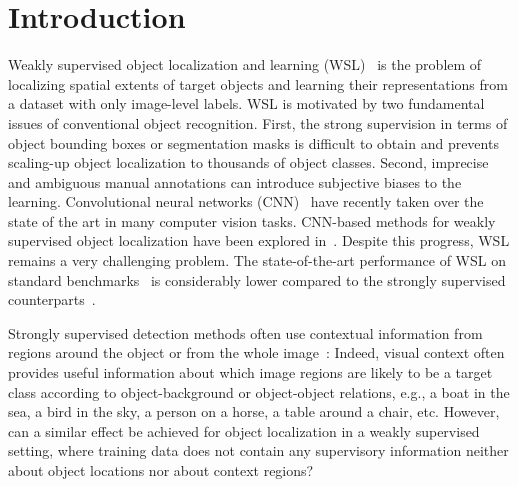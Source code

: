 \documentclass[runningheads]{llncs}
\begin{document}
\section{Introduction}

Weakly supervised object localization and learning
(WSL)~\cite{Wang:2014tg,Cinbis:2015wn} is the problem of localizing spatial
extents of target objects and learning their representations from a dataset with
only image-level labels. %
WSL is motivated by two fundamental issues of conventional object recognition.
First, the strong supervision in terms of object bounding boxes or segmentation
masks is difficult to obtain and prevents scaling-up object localization to
thousands of object classes. Second, imprecise and ambiguous manual annotations
can introduce subjective biases to the learning. 
Convolutional neural networks (CNN)~\cite{LeCun:1989bx,Krizhevsky:2012wl}
have recently taken over the state of the art in many computer vision tasks.
CNN-based methods for weakly supervised object localization have been explored
in~\cite{Oquab:2015us,Bilen:2015uo}.
Despite this progress, WSL remains a very challenging problem. The state-of-the-art performance
of WSL on standard benchmarks~\cite{Wang:2014tg,Cinbis:2015wn,Bilen:2015uo} is considerably lower compared to the
strongly supervised counterparts~\cite{Girshick:2016ig,ren15fasterrcnn,Gidaris:2015cx}. 


Strongly supervised detection methods often use contextual information from regions around the object or from the whole 
image~\cite{Torralba:2003wk,Rabinovich:2007wy,Felzenszwalb:2009wx,Girshick:2016ig,Gidaris:2015cx, desai09}:
Indeed, visual context often provides useful information about which image regions are likely to
be a target class according to object-background or object-object relations,
e.g., a boat in the sea, a bird in the sky, a person on a horse, a table around
a chair, etc. However, can a similar effect be achieved for object localization
in a weakly supervised setting, where training data does not contain any
supervisory information neither about object locations nor about context regions?
\end{document}
